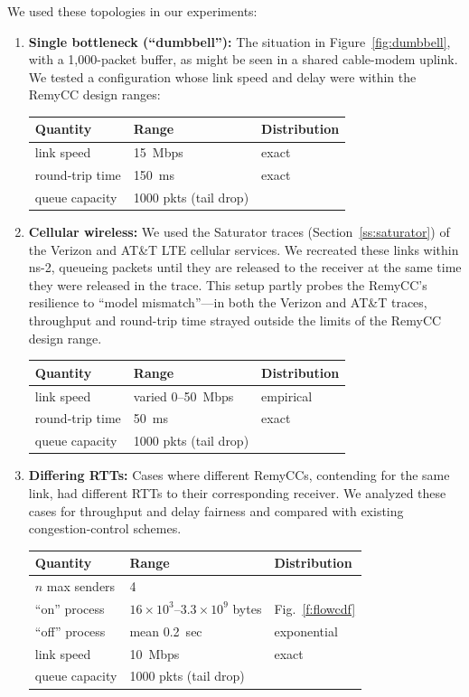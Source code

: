 \medskip
{} We used these topologies in our experiments:
\begin{enumerate}
\item {\bf Single bottleneck (``dumbbell''):} The situation in
  Figure~\ref{fig:dumbbell}, with a 1,000-packet buffer, as might be
  seen in a shared cable-modem uplink. We tested a configuration whose
  link speed and delay were within the RemyCC design ranges:


\begin{tabular}{lll}
\bf Quantity & \bf Range & \bf Distribution \\
\hline link speed & 15~Mbps & exact \\
round-trip time & 150~ms & exact \\
queue capacity & 1000 pkts (tail drop) \\
\end{tabular}

\item {\bf Cellular wireless:} We used the Saturator traces (Section~\ref{ss:saturator}) of the
  Verizon and AT\&T LTE cellular services. We recreated these
  links within ns-2, queueing packets until they are released to the
  receiver at the same time they were released in the trace. This
  setup partly probes the RemyCC's resilience to ``model mismatch''---in
  both the Verizon and AT\&T traces, throughput and round-trip time
  strayed outside the limits of the RemyCC design range.
  

\begin{tabular}{lll}
\bf Quantity & \bf Range & \bf Distribution \\
\hline link speed & varied 0--50~Mbps & empirical \\
round-trip time & 50~ms & exact \\
queue capacity & 1000 pkts (tail drop) \\
\end{tabular}

\item {\bf Differing RTTs:} Cases where different RemyCCs, contending for
  the same link, had different RTTs to their corresponding
  receiver. We analyzed these cases for throughput and delay fairness
  and compared with existing congestion-control schemes.

\begin{tabular}{lll}
\bf Quantity & \bf Range & \bf Distribution \\
\hline $n$ max senders & 4 \\
``on'' process & $16 \times 10^3$--$3.3 \times 10^9$ bytes & Fig.~\ref{f:flowcdf}\\
``off'' process & mean 0.2~sec & exponential \\
link speed & 10~Mbps & exact \\
queue capacity & 1000 pkts (tail drop) \\
\end{tabular}


\end{enumerate}
